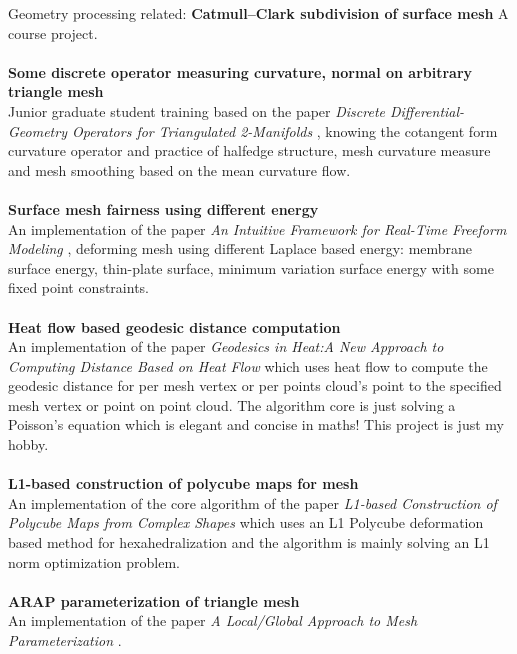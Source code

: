 \documentclass{article} %
\begin{document}
\begin{section}{Geometry processing related:}
  {\bf Catmull–Clark subdivision of surface mesh} A course project.\\\\
  {\bf Some discrete operator measuring  curvature, normal on arbitrary triangle mesh}\\Junior graduate student training based on the paper \emph{Discrete Differential-Geometry Operators for Triangulated 2-Manifolds} \cite{meyer2003discrete}, knowing the cotangent form curvature operator and practice of halfedge structure, mesh curvature measure and mesh smoothing based on the mean curvature flow.\\\\
  {\bf Surface mesh fairness using different energy}\\An implementation of the paper \emph{An Intuitive Framework for Real-Time Freeform Modeling} \cite{botsch2004intuitive}, deforming mesh using different Laplace based energy: membrane surface energy, thin-plate surface, minimum variation surface energy with some fixed point constraints.\\\\
  {\bf Heat flow based geodesic distance computation}\\An implementation of the paper \emph{Geodesics in Heat:A New Approach to Computing Distance Based on Heat Flow} \cite{crane2013geodesics} which uses heat flow to compute the geodesic distance for per mesh vertex or per points cloud's point to the specified mesh vertex or point on point cloud. The algorithm core is just solving a Poisson's equation which is elegant and concise in maths! This project is just my hobby.\\\\
  {\bf L1-based construction of polycube maps for mesh}\\  An implementation of the core algorithm of the paper \emph{L1-based Construction of Polycube Maps from Complex Shapes} \cite{huang2014} which uses an L1 Polycube deformation based method for hexahedralization and the algorithm is mainly solving an L1 norm optimization problem.\\\\
  {\bf ARAP parameterization of triangle mesh}\\An implementation of the paper \emph{A Local/Global Approach to Mesh Parameterization} \cite{liu2008local}.
\end{section}
\end{document}
